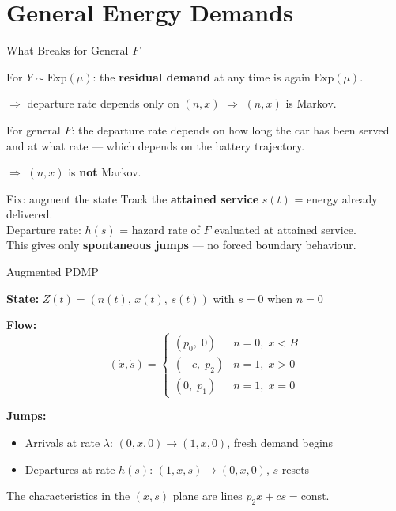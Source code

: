 \documentclass[aspectratio=169]{beamer}
\begin{document}
\section{General Energy Demands}

\begin{frame}{What Breaks for General $F$}

  For $Y\sim\text{Exp}(\mu)$: the \textbf{residual demand} at any time is again $\text{Exp}(\mu)$.

  \medskip
  $\Rightarrow$ departure rate depends only on $(n,x)$ $\Rightarrow$ $(n,x)$ is Markov.

  \bigskip
  For general $F$: the departure rate depends on how long the car has been served and at what rate — which depends on the battery trajectory.

  \medskip
  $\Rightarrow$ $(n,x)$ is \textbf{not} Markov.

  \bigskip
  \begin{block}{Fix: augment the state}
    Track the \textbf{attained service} $s(t)$ = energy already delivered.\\
    Departure rate: $h(s)$ = hazard rate of $F$ evaluated at attained service.\\
    This gives only \textbf{spontaneous jumps} — no forced boundary behaviour.
  \end{block}

\end{frame}

\begin{frame}{Augmented PDMP}

  \textbf{State:} $Z(t) = (n(t),\, x(t),\, s(t))$ \quad with $s=0$ when $n=0$

  \bigskip
  \textbf{Flow:}
  \[
    (\dot{x},\dot{s}) = \begin{cases}
      (p_0,\; 0) & n=0,\; x<B \\
      (-c,\; p_2) & n=1,\; x>0 \\
      (0,\; p_1) & n=1,\; x=0
    \end{cases}
  \]

  \bigskip
  \textbf{Jumps:}
  \begin{itemize}
    \setlength\itemsep{0.5em}
    \item Arrivals at rate $\lambda$: $(0,x,0)\to(1,x,0)$, fresh demand begins
    \item Departures at rate $h(s)$: $(1,x,s)\to(0,x,0)$, $s$ resets
  \end{itemize}

  \medskip
  The characteristics in the $(x,s)$ plane are lines $p_2 x + cs = \text{const}$.

\end{frame}
\end{document}
